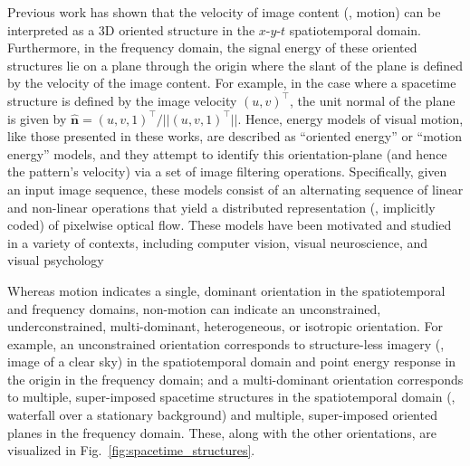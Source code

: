 Previous work \cite{adelson1985spatiotemporal,fahle1981,heeger1988,simoncelli1998,watson1983,nishimoto2011,derpanis2012spacetime} has shown that the velocity of image content (\ie, motion) can be interpreted as a 3D oriented structure in the $x$-$y$-$t$ spatiotemporal domain. Furthermore, in the frequency domain, the signal energy of these oriented structures lie on a plane through the origin where the slant of the plane is defined by the velocity of the image content.
For example, in the case where a spacetime structure is defined by the image velocity $(u, v)^\top$, the unit normal of the plane is given by $\hat{\mathbf{n}}=(u, v, 1)^\top / ||(u, v, 1)^\top||$.
Hence, energy models of visual motion, like those presented in these works, are described as ``oriented energy'' or ``motion energy'' models, and they attempt to identify this orientation-plane (and hence the pattern's velocity) via a set of image filtering operations. Specifically, given an input image sequence, these models consist of an alternating sequence of linear and non-linear operations that yield a distributed representation (\ie,  implicitly coded) of pixelwise
optical flow. These models have been motivated and studied in a variety of contexts, including computer vision, visual neuroscience, and visual psychology

Whereas motion indicates a single, dominant orientation in the spatiotemporal and frequency domains, non-motion can indicate an unconstrained, underconstrained, multi-dominant, heterogeneous, or isotropic orientation. For example, an unconstrained orientation corresponds to structure-less imagery (\eg, image of a clear sky) in the spatiotemporal domain and point energy response in the origin in the frequency domain; and a multi-dominant orientation corresponds to multiple, super-imposed spacetime structures in the spatiotemporal domain (\eg, waterfall over a stationary background) and multiple, super-imposed oriented planes in the frequency domain. These, along with the other orientations, are visualized in Fig.\ \ref{fig:spacetime_structures}.


